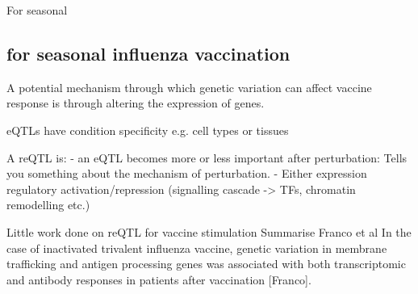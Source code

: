 For seasonal
%

\subsection{ for seasonal influenza vaccination}

A potential mechanism through which genetic variation can affect vaccine response is through altering the expression of genes.

eQTLs have condition specificity
e.g. cell types or tissues

A reQTL is: \autocite{vandiedonck2017GeneticAssociationMolecular}
- an eQTL becomes more or less important after perturbation: Tells you something about the mechanism of perturbation.
- Either expression regulatory activation/repression (signalling cascade -> TFs, chromatin remodelling etc.)

Little work done on reQTL for vaccine stimulation
Summarise Franco et al
In the case of inactivated trivalent influenza vaccine, genetic variation in membrane trafficking and antigen processing genes was associated with both transcriptomic and antibody responses in patients after vaccination [Franco].

